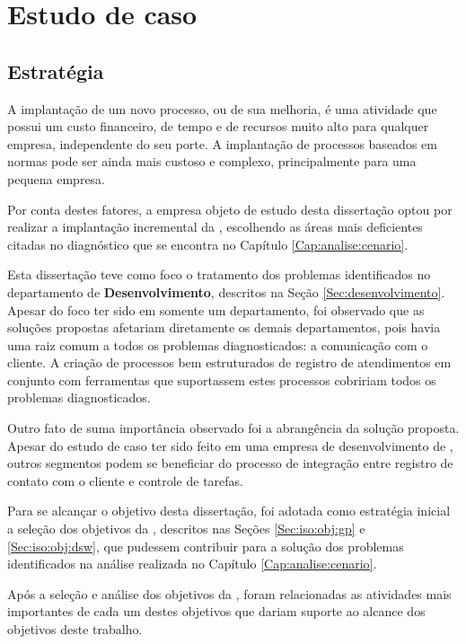 
\chapter{Estudo de caso}

\section{Estratégia}
\label{Sec:ec:estrategia}

A implantação de um novo processo, ou de sua melhoria, é uma atividade que possui um custo financeiro, de tempo e de recursos muito alto para qualquer empresa, independente do seu porte. A implantação de processos baseados em normas pode ser ainda mais custoso e complexo, principalmente para uma pequena empresa.

Por conta destes fatores, a empresa objeto de estudo desta dissertação optou por realizar a implantação incremental da \iso, escolhendo as áreas mais deficientes citadas no diagnóstico que se encontra no Capítulo \ref{Cap:analise:cenario}.

Esta dissertação teve como foco o tratamento dos problemas identificados no departamento de \textbf{Desenvolvimento}, descritos na Seção \ref{Sec:desenvolvimento}. Apesar do foco ter sido em somente um departamento, foi observado que as soluções propostas afetariam diretamente os demais departamentos, pois havia uma raiz comum a todos os problemas diagnosticados: a comunicação com o cliente. A criação de processos bem estruturados de registro de atendimentos em conjunto com ferramentas que suportassem estes processos cobririam todos os problemas diagnosticados.

Outro fato de suma importância observado foi a abrangência da solução proposta. Apesar do estudo de caso ter sido feito em uma empresa de desenvolvimento de \sw, outros segmentos podem se beneficiar do processo de integração entre registro de contato com o cliente e controle de tarefas. 

Para se alcançar o objetivo desta dissertação, foi adotada como estratégia inicial a seleção dos objetivos da \iso, descritos nas Seções \ref{Sec:iso:obj:gp} e \ref{Sec:iso:obj:dsw}, que pudessem contribuir para a solução dos problemas identificados na análise realizada no Capítulo \ref{Cap:analise:cenario}.

Após a seleção e análise dos objetivos da \iso, foram relacionadas as atividades mais importantes de cada um destes objetivos que dariam suporte ao alcance dos objetivos deste trabalho.

